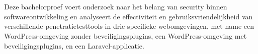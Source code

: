 
%
%
%
%
%

%



\chapter*{}

Deze bachelorproef voert onderzoek naar het belang van security binnen softwareontwikkeling en analyseert de effectiviteit en 
gebruiksvriendelijkheid van verschillende penetratietesttools in drie specifieke webomgevingen, met name  
een WordPress-omgeving zonder beveiligingsplugins, een WordPress-omgeving met beveiligingsplugins, en een Laravel-applicatie.

